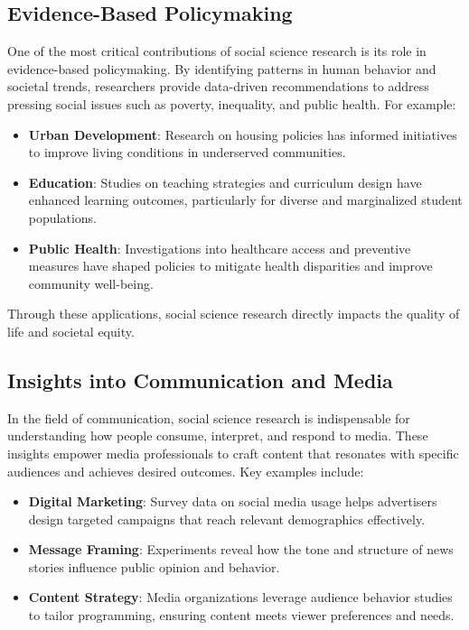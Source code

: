 \documentclass[
]{book}
\providecommand{\tightlist}{%
  \setlength{\itemsep}{0pt}\setlength{\parskip}{0pt}}
\begin{document}
\subsection*{Evidence-Based Policymaking}\label{evidence-based-policymaking}

One of the most critical contributions of social science research is its role in evidence-based policymaking. By identifying patterns in human behavior and societal trends, researchers provide data-driven recommendations to address pressing social issues such as poverty, inequality, and public health. For example:

\begin{itemize}
\tightlist
\item
  \textbf{Urban Development}: Research on housing policies has informed initiatives to improve living conditions in underserved communities.
\item
  \textbf{Education}: Studies on teaching strategies and curriculum design have enhanced learning outcomes, particularly for diverse and marginalized student populations.
\item
  \textbf{Public Health}: Investigations into healthcare access and preventive measures have shaped policies to mitigate health disparities and improve community well-being.
\end{itemize}

Through these applications, social science research directly impacts the quality of life and societal equity.

\subsection*{Insights into Communication and Media}\label{insights-into-communication-and-media}

In the field of communication, social science research is indispensable for understanding how people consume, interpret, and respond to media. These insights empower media professionals to craft content that resonates with specific audiences and achieves desired outcomes. Key examples include:

\begin{itemize}
\tightlist
\item
  \textbf{Digital Marketing}: Survey data on social media usage helps advertisers design targeted campaigns that reach relevant demographics effectively.
\item
  \textbf{Message Framing}: Experiments reveal how the tone and structure of news stories influence public opinion and behavior.
\item
  \textbf{Content Strategy}: Media organizations leverage audience behavior studies to tailor programming, ensuring content meets viewer preferences and needs.
\end{itemize}
\end{document}

